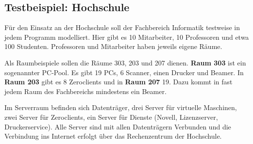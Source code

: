 \subsection{Testbeispiel: Hochschule}
Für den Einsatz an der Hochschule soll der Fachbereich Informatik testweise in jedem Programm modelliert. Hier gibt es 10 Mitarbeiter, 10 Professoren und etwa 100 Studenten. Professoren und Mitarbeiter haben jeweils eigene Räume.

Als Raumbeispiele sollen die Räume 303, 203 und 207 dienen.
\textbf{Raum 303} ist ein sogenannter PC-Pool. Es gibt 19 PCs, 6 Scanner, einen Drucker und Beamer. 
In \textbf{Raum 203} gibt es 8 Zeroclients und in \textbf{Raum 207} 19. Dazu kommt in fast jedem Raum des Fachbereichs mindestens ein Beamer.

Im Serverraum befinden sich Datenträger, drei Server für virtuelle Maschinen, zwei Server für Zeroclients, ein Server für Dienste (Novell, Lizenzserver, Druckerservice).
Alle Server sind mit allen Datenträgern Verbunden und die Verbindung ins Internet erfolgt über das Rechenzentrum der Hochschule.